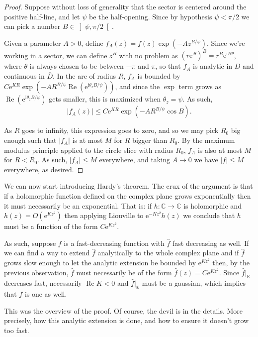 \documentclass{amsart}
\newcommand{\R}{\mathbb{R}}
\newcommand{\C}{\mathbb{C}}
\newcommand{\e}{\mathrm{e}}
\newcommand{\I}{\mathrm{i}}
\DeclareMathOperator{\re}{Re}
\begin{document}
\begin{proof}
Suppose without loss of generality that the sector is centered around the positive half-line, and let $\psi$ be the half-opening. Since by hypothesis $\psi < \pi/2$ we can pick a number $B \in \left]\psi, \pi/2 \right[$.

Given a parameter $A > 0$, define $f_A(z) = f(z) \exp(-A z^{B/\psi})$. Since we're working in a sector, we can define $z^B$ with no problem as $(r \e^{\I \theta})^B = r^B \e^{\I B \theta}$, where $\theta$ is always chosen to be between $-\pi$ and $\pi$, so that $f_A$ is analytic in $D$ and continuous in $\overline D$. In the arc of radius $R$, $f_A$ is bounded by $C \e^{K R} \exp(-A R^{B/\psi} \re(\e^{\I \theta_z B / \psi}))$, and since the $\exp$ term grows as $\re(\e^{\I \theta_z B / \psi})$ gets smaller, this is maximized when $\theta_z = \psi$. As such,
\[\lvert f_A(z) \rvert \leq C \e^{K R} \exp(-A R^{B/\psi} \cos B).\]

As $R$ goes to infinity, this expression goes to zero, and so we may pick $R_0$ big enough such that $\lvert f_A \rvert$ is at most $M$ for $R$ bigger than $R_0$. By the maximum modulus principle applied to the circle slice with radius $R_0$, $f_A$ is also at most $M$ for $R < R_0$. As such, $\lvert f_A \rvert \leq M$ everywhere, and taking $A \to 0$ we have $\lvert f \rvert \leq M$ everywhere, as desired.
\end{proof}

We can now start introducing Hardy's theorem. The crux of the argument is that if a holomorphic function defined on the complex plane grows exponentially then it must necessarily be an exponential. That is: if $h : \C \to \C$ is holomorphic and $h(z) = O(\e^{K z^2})$ then applying Liouville to $\e^{-K z^2} h(z)$ we conclude that $h$ must be a function of the form $C \e^{K z^2}$.

As such, suppose $f$ is a fast-decreasing function with $\hat f$ fast decreasing as well. If we can find a way to extend $\hat f$ analytically to the whole complex plane and if $\hat f$ grows slow enough to let the analytic extension be bounded by $\e^{K z^2}$ then, by the previous observation, $\hat f$ must necessarily be of the form $\hat f(z) = C \e^{K z^2}$. Since $\hat f |_\R$ decreases fast, necessarily $\re K < 0$ and $\hat f |_\R$ must be a gaussian, which implies that $f$ is one as well.

This was the overview of the proof. Of course, the devil is in the details. More precisely, how this analytic extension is done, and how to ensure it doesn't grow too fast.
\end{document}
